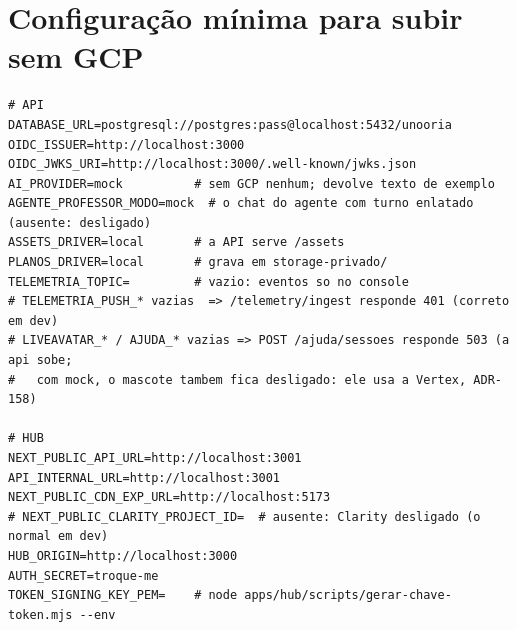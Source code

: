\section{Configuração mínima para subir sem GCP}

\begin{lstlisting}[language=bashunoo, caption={A combinação que faz \rf{RNF-14} ser verdade}]
# API
DATABASE_URL=postgresql://postgres:pass@localhost:5432/unooria
OIDC_ISSUER=http://localhost:3000
OIDC_JWKS_URI=http://localhost:3000/.well-known/jwks.json
AI_PROVIDER=mock          # sem GCP nenhum; devolve texto de exemplo
AGENTE_PROFESSOR_MODO=mock  # o chat do agente com turno enlatado (ausente: desligado)
ASSETS_DRIVER=local       # a API serve /assets
PLANOS_DRIVER=local       # grava em storage-privado/
TELEMETRIA_TOPIC=         # vazio: eventos so no console
# TELEMETRIA_PUSH_* vazias  => /telemetry/ingest responde 401 (correto em dev)
# LIVEAVATAR_* / AJUDA_* vazias => POST /ajuda/sessoes responde 503 (a api sobe;
#   com mock, o mascote tambem fica desligado: ele usa a Vertex, ADR-158)

# HUB
NEXT_PUBLIC_API_URL=http://localhost:3001
API_INTERNAL_URL=http://localhost:3001
NEXT_PUBLIC_CDN_EXP_URL=http://localhost:5173
# NEXT_PUBLIC_CLARITY_PROJECT_ID=  # ausente: Clarity desligado (o normal em dev)
HUB_ORIGIN=http://localhost:3000
AUTH_SECRET=troque-me
TOKEN_SIGNING_KEY_PEM=    # node apps/hub/scripts/gerar-chave-token.mjs --env
\end{lstlisting}
